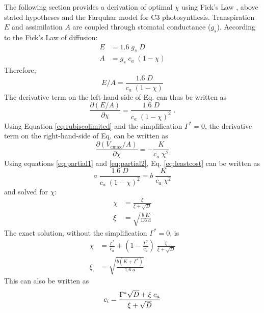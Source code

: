 \documentclass{myreport}
\begin{document}
The following section provides a derivation of optimal $\chi$ using Fick's Law \citep{fick1855}, above stated hypotheses and the Farquhar model for C3 photosynthesis. 
Transpiration $E$ and assimilation $A$ are coupled through stomatal conductance ($g_s$).
According to the Fick's Law of diffusion:
\begin{align}
\label{eq:fick}
    E &= 1.6 \; g_s \; D \\
    A &= g_s \; c_a \; (1-\chi)
\end{align}
Therefore,
\begin{equation}
    E/A = \frac{1.6 \; D}{c_a\;(1-\chi)}
\end{equation}
The derivative term on the left-hand-side of Eq.\label{eq:leastcost} can thus be written as
\begin{equation}
\label{eq:partial1}
    \frac{\partial (E/A)}{\partial \chi} = \frac{1.6\;D}{c_a\;(1-\chi)^2}\;.
\end{equation}
Using Equation \ref{eq:rubiscolimited} and the simplification $\Gamma^{\ast}=0$, the derivative term on the right-hand-side of Eq.\label{eq:leastcost} can be written as
\begin{equation}
\label{eq:partial2}
    \frac{\partial (V_{\mathrm{cmax}}/A)}{\partial \chi} = - \frac{K}{c_a\;\chi^2}
\end{equation}
Using equations \ref{eq:partial1} and \ref{eq:partial2}, Eq. \ref{eq:leastcost} can be written as
\begin{equation}
    a\;\frac{1.6\;D}{c_a\;(1-\chi)^2} = b\;\frac{K}{c_a\;\chi^2}
\end{equation}
and solved for $\chi$:
\begin{align}
    \chi &= \frac{\xi}{\xi + \sqrt{D}} \\ 
    \xi &= \sqrt{\frac{b\;K}{1.6\;a}}
\end{align}
The exact solution, without the simplification $\Gamma^{\ast}=0$, is 
\begin{align}
\label{eq:chi_exact}
    \chi &= \frac{\Gamma^{\ast}}{c_a} + \left(1- \frac{\Gamma^{\ast}}{c_a}\right)\;\frac{\xi}{\xi + \sqrt{D}}\\
    \xi &= \sqrt{\frac{b(K+\Gamma^{\ast})}{1.6\;a}}
\end{align}
This can also be written as
\begin{equation}
\label{eq:ci}
    c_i = \frac{\Gamma^{\ast}\sqrt{D}+ \xi\;c_a}{\xi + \sqrt{D}} \\ 
\end{equation}
\end{document}
